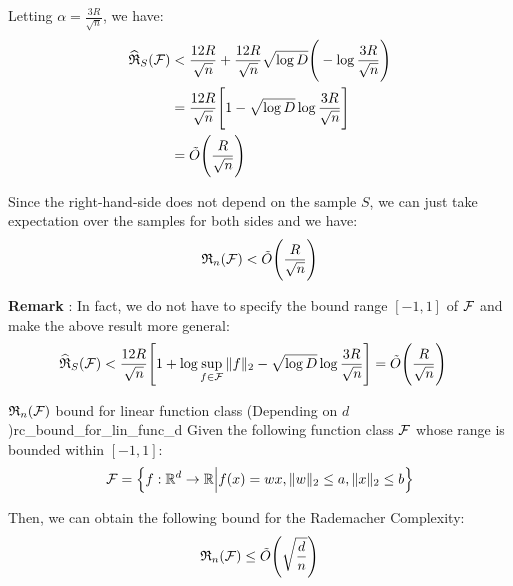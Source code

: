 \begin{proof*}
    \noindent Letting $\alpha=\frac{3R}{\sqrt n}$, we have:
    \begin{align*}
        \widehat{\mathfrak{R}}_S(\mathcal{F}) &< \frac{12R}{\sqrt n} + \frac{12R}{\sqrt n}\sqrt{\log D} \Bigg(  - \log\frac{3R}{\sqrt n}  \Bigg) \\
        &= \frac{12R}{\sqrt n} \Bigg[ 
            1 - \sqrt{\log D}\log\frac{3R}{\sqrt{n}}
         \Bigg] \\
        &= \tilde O\Bigg(  \frac{R}{\sqrt n}  \Bigg)
    \end{align*}

    \noindent Since the right-hand-side does not depend on the sample $S$, we can just take expectation over the samples for both sides and we have:
    \begin{align*}
        \mathfrak{R}_n(\mathcal{F}) < \tilde O\Bigg(  \frac{R}{\sqrt n}  \Bigg)
    \end{align*}

    \noindent \textbf{Remark} : In fact, we do not have to specify the bound range $[-1, 1]$ of $\mathcal{F}$ and make the above result more general:
    \begin{align*}
        \widehat{\mathfrak{R}}_S(\mathcal{F}) &< \frac{12R}{\sqrt n}\Bigg[ 
            1 + \log\sup_{f\in\mathcal{F}}\|f\|_2 - \sqrt{\log D}\log\frac{3R}{\sqrt{n}}
         \Bigg] = \tilde O\Bigg(  \frac{R}{\sqrt n}  \Bigg)
    \end{align*}
\end{proof*}


\begin{proposition}{$\mathfrak{R}_n(\mathcal{F})$ bound for linear function class (Depending on $d$)}{rc_bound_for_lin_func_d}
    Given the following function class $\mathcal{F}$ whose range is bounded within $[-1, 1]$:
    \begin{align*}
        \mathcal{F} = \Big\{ 
            f:\mathbb{R}^d\to\mathbb{R} \Big| f(x) = wx, \|w\|_2 \le a, \|x\|_2 \le b
         \Big\}
    \end{align*}

    \noindent Then, we can obtain the following bound for the Rademacher Complexity:
    \begin{align*}
        \mathfrak{R}_n(\mathcal{F}) \le \tilde O \Bigg( \sqrt{
            \frac{d}{n}
        } \Bigg)
    \end{align*}
\end{proposition}

\begin{proof*}
    
\end{proof*}


